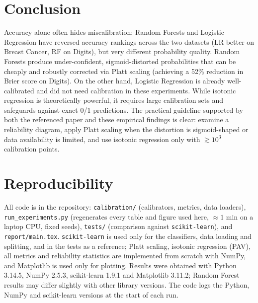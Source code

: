 \documentclass[11pt,a4paper]{article}
\begin{document}
\section{Conclusion}
Accuracy alone often hides miscalibration: Random Forests and Logistic Regression have reversed accuracy rankings across the two datasets (LR better on Breast Cancer, RF on Digits), but very different probability quality. Random Forests produce under-confident, sigmoid-distorted probabilities that can be cheaply and robustly corrected via Platt scaling (achieving a 52\% reduction in Brier score on Digits). On the other hand, Logistic Regression is already well-calibrated and did not need calibration in these experiments. While isotonic regression is theoretically powerful, it requires large calibration sets and safeguards against exact 0/1 predictions. The practical guideline supported by both the referenced paper and these empirical findings is clear: examine a reliability diagram, apply Platt scaling when the distortion is sigmoid-shaped or data availability is limited, and use isotonic regression only with $\gtrsim10^3$ calibration points.

\section*{Reproducibility}
All code is in the repository: \texttt{calibration/} (calibrators, metrics, data loaders), \texttt{run\_experiments.py} (regenerates every table and figure used here, ${\approx}1$ min on a laptop CPU, fixed seeds), \texttt{tests/} (comparison against \texttt{scikit-learn}), and \texttt{report/main.tex}. \texttt{scikit-learn} is used only for the classifiers, data loading and splitting, and in the tests as a reference; Platt scaling, isotonic regression (PAV), all metrics and reliability statistics are implemented from scratch with NumPy, and Matplotlib is used only for plotting.
Results were obtained with Python 3.14.5, NumPy 2.5.3, scikit-learn 1.9.1 and Matplotlib 3.11.2; Random Forest results may differ slightly with other library versions. The code logs the Python, NumPy and scikit-learn versions at the start of each run.
\end{document}
